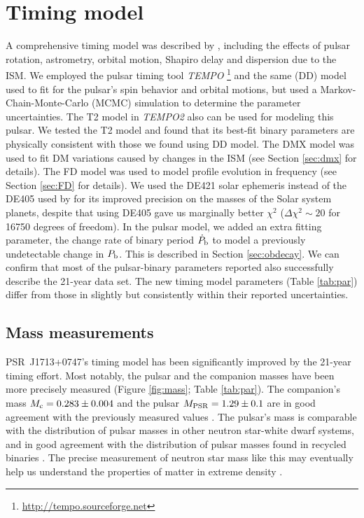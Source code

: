 \section{Timing model}
\label{sec:model}
A comprehensive timing model was described by \citet{sns+05},
including the effects of pulsar rotation, astrometry, orbital motion,
Shapiro delay and dispersion due to the ISM.
We employed the pulsar timing tool \textit{TEMPO}
\footnote{\url{http://tempo.sourceforge.net}} and the same
\citet{dd86} (DD) model \citet{sns+05} used to fit for the pulsar's
spin behavior and orbital motions, but used a Markov-Chain-Monte-Carlo
(MCMC) simulation to determine the parameter uncertainties.
The T2 model in \textit{TEMPO2} \citep{hem06} also can be used for modeling this pulsar. We tested the T2 model and found that its best-fit binary parameters are physically consistent with those we found using DD model.
The DMX model was used to fit DM variations caused by changes in the ISM (see Section \ref{sec:dmx} for details). The FD model was used to model profile
evolution in frequency (see Section \ref{sec:FD} for details). 
We used the DE421 solar ephemeris instead of the DE405 used by
\citet{sns+05} for its improved precision on the masses of the Solar system
planets, despite that using DE405 gave us marginally better $\chi^2$
($\Delta\chi^2\sim20$ for 16750 degrees of freedom).
In the pulsar model, we added an extra fitting parameter, the change rate of binary period $\dot{P}_{\rm b}$ to model a previously undetectable change in $P_{\rm b}$. This is described in Section \ref{sec:obdecay}.    
We can confirm that most of the pulsar-binary parameters reported
\citet{sns+05} also successfully describe the 21-year data
set. The new timing model parameters (Table \ref{tab:par}) differ from
those in \citet{sns+05} slightly but consistently within their reported uncertainties.



\subsection{Mass measurements}
\label{sec:mass}
PSR~J1713+0747's timing model has been significantly improved by the 21-year timing effort.
Most notably, the pulsar and the companion masses have been more precisely measured
(Figure \ref{fig:mass}; Table \ref{tab:par}). The
companion's mass $M_{\rm c} = 0.283\pm0.004$ and the pulsar $M_{\rm PSR}=1.29\pm0.1$ are in good agreement with the previously measured values \cite{sns+05}.
The pulsar's mass is comparable with the distribution of pulsar masses
in other neutron star-white dwarf systems, and in good
agreement with the distribution of pulsar masses found in recycled binaries
\citep{opns12,kkdt13}. The precise measurement of neutron star mass like this
may eventually help us understand the properties of matter in extreme 
density \citep{lat12}.

